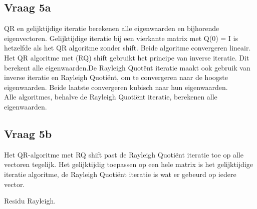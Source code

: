 \subsection{Vraag 5a}
QR en gelijktijdige iteratie berekenen alle eigenwaarden en bijhorende eigenvectoren. Gelijktijdige iteratie bij een vierkante matrix met Q(0) = I is hetzelfde als het QR algoritme zonder shift. Beide algoritme convergeren lineair.\\ [12pt]

Het QR algoritme met (RQ) shift gebruikt het principe van inverse iteratie. Dit berekent alle eigenwaarden.De Rayleigh Quot\"ent iteratie maakt ook gebruik van inverse iteratie en Rayleigh Quoti\"ent, om te convergeren naar de hoogste eigenwaarden. Beide laatste convergeren kubisch naar hun eigenwaarden.\\ [12pt]

Alle algoritmes, behalve de Rayleigh Quoti\"ent iteratie, berekenen alle eigenwaarden.\\ [12pt]

\subsection{Vraag 5b}
Het QR-algoritme met RQ shift past de Rayleigh Quoti\"ent iteratie toe op alle vectoren tegelijk. Het gelijktijdig toepassen op een hele matrix is het gelijktijdige iteratie algoritme, de Rayleigh Quoti\"ent iteratie is wat er gebeurd op iedere vector.

\begin{center}
\end{center}
\caption{Residu Rayleigh.}

